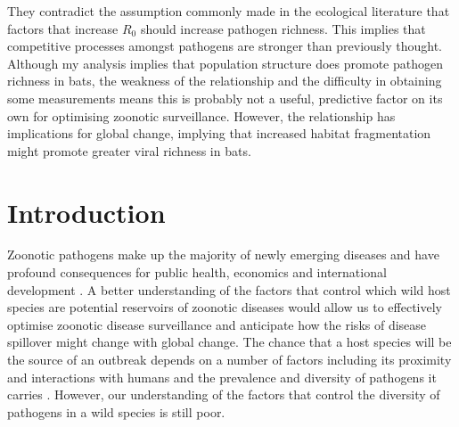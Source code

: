 They contradict the assumption commonly made in the ecological literature that factors that increase $R_0$ should increase pathogen richness.
This implies that competitive processes amongst pathogens are stronger than previously thought.
Although my analysis implies that population structure does promote pathogen richness in bats, the weakness of the relationship and the difficulty in obtaining some measurements means this is probably not a useful, predictive factor on its own for optimising zoonotic surveillance.
However, the relationship has implications for global change, implying that increased habitat fragmentation might promote greater viral richness in bats.






\section{Introduction}



Zoonotic pathogens make up the majority of newly emerging diseases and have profound consequences for public health, economics and international development \cite{jones2008global, smith2014global, ebolaWorldbank}.
A better understanding of the factors that control which wild host species are potential reservoirs of zoonotic diseases would allow us to effectively optimise zoonotic disease surveillance and anticipate how the risks of disease spillover might change with global change.
The chance that a host species will be the source of an outbreak depends on a number of factors including its proximity and interactions with humans and the prevalence and diversity of pathogens it carries \cite{wolfe2000deforestation}.
However, our understanding of the factors that control the diversity of pathogens in a wild species is still poor.






